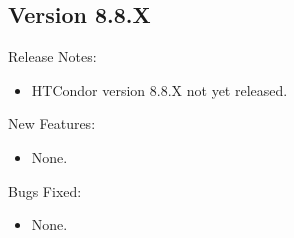 \subsection*{\label{sec:New-8-8-X}Version 8.8.X}

\noindent Release Notes:

\begin{itemize}

\item HTCondor version 8.8.X not yet released.

\end{itemize}


\noindent New Features:

\begin{itemize}

\item None.

\end{itemize}

\noindent Bugs Fixed:

\begin{itemize}

\item None.

\end{itemize}

